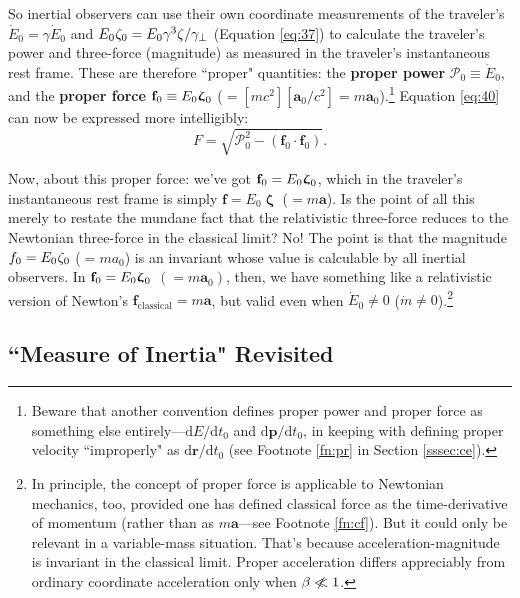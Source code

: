 \documentclass[12pt]{article}
\renewcommand{\vv}[1]{\mathbf{#1}}
\newcommand{\dd}[1]{\mathrm{d}#1}
\newcommand{\vvzeta}{\bm{\upzeta}}
\begin{document}
So inertial observers can use their own coordinate measurements of the traveler's $\mathring{E}_0 = \gamma \dot{E}_0$ and $E_0 \mkern.5mu \zeta_0 = E_0 \gamma^3 \zeta / \gamma_{\perp}$ (Equation \ref{eq:37}) to calculate the traveler's power and three-force (magnitude) as measured in the traveler's instantaneous rest frame. These are therefore ``proper" quantities: the \textbf{proper power} $\mathcal{P}_0 \equiv \mathring{E}_0$, and the \textbf{proper force} $\vv f_0 \equiv E_0 \vvzeta_{\mkern1mu 0}$ ($= [mc^2][\vv a_0 / c^2] = m \vv a_0$).\footnote{Beware that another convention defines proper power and proper force as something else entirely---$\dd E / \dd t_0$ and $\dd \vv p / \dd t_0$, in keeping with defining proper velocity ``improperly" as $\dd \vv r / \dd t_0$ (see Footnote \ref{fn:pr} in Section \ref{sssec:ce}).} Equation \ref{eq:40} can now be expressed more intelligibly:
\begin{equation}\label{eq:42}
F = \sqrt{\mathcal{P}_0^2 - (\vv f_0 \cdot \vv f_0)} .
\end{equation}

Now, about this proper force: we've got $\vv f_0 = E_0 \vvzeta_{\mkern1mu 0}$, which in the traveler's instantaneous rest frame is simply $\vv f = E_0 \vvzeta$ ($= m \vv a$). Is the point of all this merely to restate the mundane fact that the relativistic three-force reduces to the Newtonian three-force in the classical limit? No! The point is that the magnitude $f_0 = E_0 \mkern.5mu \zeta_0$ ($= m a_0$) is an invariant whose value is calculable by all inertial observers. In $\vv f_0 = E_0 \vvzeta_{\mkern1mu 0}$ $(= m \vv a_0)$, then, we have something like a relativistic version of Newton's $\vv f_{\mathrm{classical}} = m \vv a$, but valid even when $\dot{E}_0 \neq 0$ ($\dot{m} \neq 0$).\footnote{In principle, the concept of proper force is applicable to Newtonian mechanics, too, provided one has defined classical force as the time-derivative of momentum (rather than as $m \vv a$---see Footnote \ref{fn:cf}). But it could only be relevant in a variable-mass situation. That's because acceleration-magnitude is invariant in the classical limit. Proper acceleration differs appreciably from ordinary coordinate acceleration only when $\beta \centernot{\ll} 1$.}


\subsection[“Measure of Inertia” Revisited]{``Measure of Inertia" Revisited}\label{ssec:in}
\end{document}
